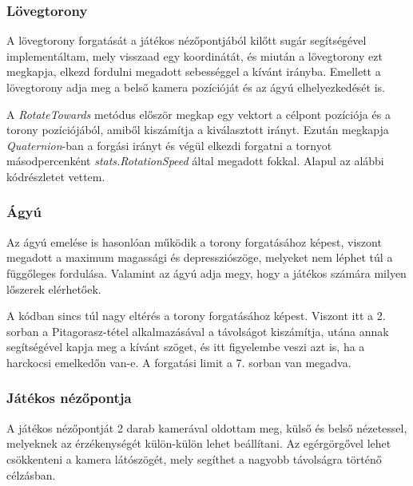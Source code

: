 \documentclass[
]{thesis-ekf}
\theoremstyle{definition}
\theoremstyle{remark}
\begin{document}
\subsubsection{Lövegtorony}

A lövegtorony forgatását a játékos nézőpontjából kilőtt sugár segítségével implementáltam, mely visszaad egy koordinátát, és miután a lövegtorony ezt megkapja, elkezd fordulni megadott sebességgel a kívánt irányba. Emellett a lövegtorony adja meg a belső kamera pozícióját és az ágyú elhelyezkedését is.



A \emph{RotateTowards} metódus először megkap egy vektort a célpont pozíciója és a torony pozíciójából, amiből kiszámítja a kiválasztott irányt. Ezután megkapja \emph{Quaternion}-ban a forgási irányt és végül elkezdi forgatni a tornyot másodpercenként \break
\emph{stats.RotationSpeed} által megadott fokkal. Alapul az alábbi kódrészletet\cite{rotation} vettem.

\subsubsection{Ágyú}

Az ágyú emelése is hasonlóan működik a torony forgatásához képest, viszont megadott a maximum magassági és depressziószöge, melyeket nem léphet túl a függőleges fordulása. Valamint az ágyú adja megy, hogy a játékos számára milyen lőszerek elérhetőek.



A kódban sincs túl nagy eltérés a torony forgatásához képest. Viszont itt a 2. sorban a Pitagorasz-tétel\cite{pitagorasz} alkalmazásával a távolságot kiszámítja, utána annak segítségével kapja meg a kívánt szöget, és itt figyelembe veszi azt is, ha a harckocsi emelkedőn van-e. A forgatási limit a 7. sorban van megadva.


\subsubsection{Játékos nézőpontja}

A játékos nézőpontját 2 darab kamerával oldottam meg, külső és belső nézetessel, melyeknek az érzékenységét külön-külön lehet beállítani. Az egérgörgővel lehet csökkenteni a kamera látószögét, mely segíthet a nagyobb távolságra történő célzásban.
\end{document}
